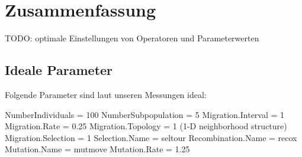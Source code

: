 \section{Zusammenfassung}\label{conclusion}

TODO: optimale Einstellungen von Operatoren und Parameterwerten

\subsection{Ideale Parameter}

Folgende Parameter sind laut unseren Messungen ideal:

NumberIndividuals = 100
NumberSubpopulation = 5
Migration.Interval = 1
Migration.Rate = 0.25
Migration.Topology = 1 (1-D neighborhood structure)
Migration.Selection = 1
Selection.Name = seltour
Recombination.Name = recox
Mutation.Name = mutmove
Mutation.Rate = 1.25
